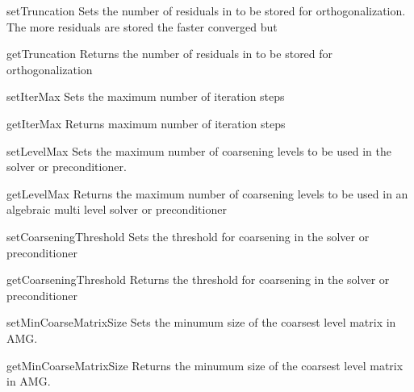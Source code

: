 \begin{methoddesc}[SolverOptions]{setTruncation}{}
Sets the number of residuals in \GMRES to be stored for orthogonalization.  The more residuals are stored the faster \GMRES converged but
\end{methoddesc}

\begin{methoddesc}[SolverOptions]{getTruncation}{}
Returns the number of residuals in \GMRES to be stored for orthogonalization
\end{methoddesc}


\begin{methoddesc}[SolverOptions]{setIterMax}{}
Sets the maximum number of iteration steps
\end{methoddesc}

\begin{methoddesc}[SolverOptions]{getIterMax}{}
Returns maximum number of iteration steps
\end{methoddesc}

\begin{methoddesc}[SolverOptions]{setLevelMax}{}
Sets the maximum number of coarsening levels to be used in the \AMG solver or preconditioner.
\end{methoddesc}

\begin{methoddesc}[SolverOptions]{getLevelMax}{}
Returns the maximum number of coarsening levels to be used in an algebraic multi level solver or preconditioner
\end{methoddesc}

\begin{methoddesc}[SolverOptions]{setCoarseningThreshold}{}
Sets the threshold for coarsening in the \AMG solver or preconditioner
\end{methoddesc}

\begin{methoddesc}[SolverOptions]{getCoarseningThreshold}{}
Returns the threshold for coarsening in the \AMG solver or preconditioner
\end{methoddesc}

\begin{methoddesc}[SolverOptions]{setMinCoarseMatrixSize}{}
Sets the minumum size of the coarsest level matrix in AMG.
\end{methoddesc}

\begin{methoddesc}[SolverOptions]{getMinCoarseMatrixSize}{}
Returns the minumum size of the coarsest level matrix in AMG.
\end{methoddesc}

